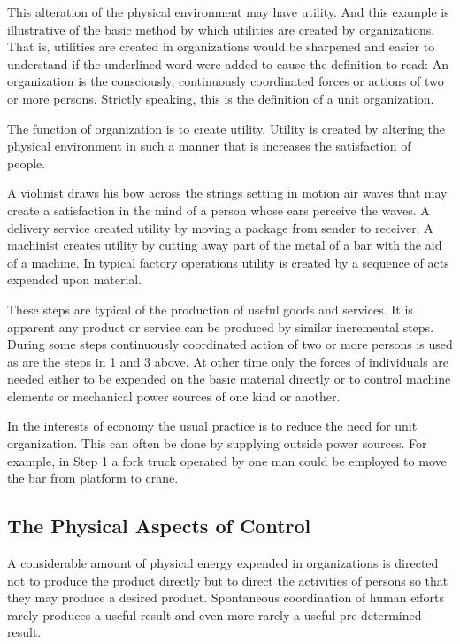 This alteration of the physical environment may have utility. And this example is illustrative of the basic method by which utilities are created by organizations. That is, utilities are created in organizations would be sharpened and easier to understand if the underlined word were added to cause the definition to read: An organization is the consciously, continuously coordinated forces or actions of two or more persons. Strictly speaking, this is the definition of a unit organization.

The function of organization is to create utility. Utility is created by altering the physical environment in such a manner that is increases the satisfaction of people.

A violinist draws his bow across the strings setting in motion air waves that may create a satisfaction in the mind of a person whose ears perceive the waves. A delivery service created utility by moving a package from sender to receiver. A machinist creates utility by cutting away part of the metal of a bar with the aid of a machine. In typical factory operations utility is created by a sequence of acts expended upon material.

These steps are typical of the production of useful goods and services. It is apparent any product or service can be produced by similar incremental steps. During some steps continuously coordinated action of two or more persons is used as are the steps in 1 and 3 above. At other time only the forces of individuals are needed either to be expended on the basic material directly or to control machine elements or mechanical power sources of one kind or another.

In the interests of economy the usual practice is to reduce the need for unit organization. This can often be done by supplying outside power sources. For example, in Step 1 a fork truck operated by one man could be employed to move the bar from platform to crane.

\subsection{The Physical Aspects of Control}

A considerable amount of physical energy expended in organizations is directed not to produce the product directly but to direct the activities of persons so that they may produce a desired product. Spontaneous coordination of human efforts rarely produces a useful result and even more rarely a useful pre-determined result.

